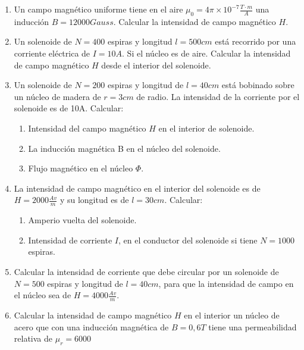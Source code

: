 \documentclass[../main]{subfiles}
\begin{document}
\begin{enumerate}
    \item Un campo magnético uniforme tiene en el aire $\mu_0=4\pi \times 10^{-7} \frac{T \cdot m}{A}$ una inducción $B=12000Gauss$. Calcular la intensidad de campo magnético $H$.
    \item Un solenoide de $N=400$ espiras y longitud $l=500cm$ está recorrido por una corriente eléctrica de $I=10A$. Si el núcleo es de aire. Calcular la intensidad de campo magnético $H$ desde el interior del solenoide.
    \item Un solenoide de $N=200$ espiras y longitud de $l=40cm$ está bobinado sobre un núcleo de madera de $r=3cm$ de radio. La intensidad de la corriente por el solenoide es de 10A. Calcular:
    \begin{enumerate}
        \item Intensidad del campo magnético $H$ en el interior de solenoide.
        \item La inducción magnética B en el núcleo del solenoide.
        \item Flujo magnético en el núcleo $\Phi$.
    \end{enumerate}
    \item La intensidad de campo magnético en el interior del solenoide es de $H=2000\frac{Av}{m}$ y su longitud es de $l=30cm$. Calcular:
    \begin{enumerate}
        \item Amperio vuelta del solenoide.
        \item Intensidad de corriente $I$, en el conductor del solenoide si tiene $N=1000$ espiras.
    \end{enumerate}
    \item Calcular la intensidad de corriente que debe circular por un solenoide de $N=500$ espiras y longitud de $l=40cm$, para que la intensidad de campo en el núcleo sea de $H=4000\frac{Av}{m}$.
    \item Calcular la intensidad de campo magnético $H$ en el interior un núcleo de acero que con una inducción magnética de $B=0,6T$ tiene una permeabilidad relativa de $\mu_r=6000$
\end{enumerate}
\end{document}
